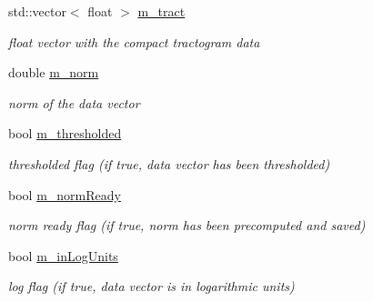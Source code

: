 \begin{DoxyCompactItemize}
\item 
\hypertarget{classcompactTract_adc11b75d4726c6bfc7891ef3dbaac133}{std\-::vector$<$ float $>$ \hyperlink{classcompactTract_adc11b75d4726c6bfc7891ef3dbaac133}{m\-\_\-tract}}\label{classcompactTract_adc11b75d4726c6bfc7891ef3dbaac133}

\begin{DoxyCompactList}\small\item\em float vector with the compact tractogram data \end{DoxyCompactList}\item 
\hypertarget{classcompactTract_a27eeff3e161d463509b144b3b19eff97}{double \hyperlink{classcompactTract_a27eeff3e161d463509b144b3b19eff97}{m\-\_\-norm}}\label{classcompactTract_a27eeff3e161d463509b144b3b19eff97}

\begin{DoxyCompactList}\small\item\em norm of the data vector \end{DoxyCompactList}\item 
\hypertarget{classcompactTract_a73f593f5373a547977675bdb1c5e1c41}{bool \hyperlink{classcompactTract_a73f593f5373a547977675bdb1c5e1c41}{m\-\_\-thresholded}}\label{classcompactTract_a73f593f5373a547977675bdb1c5e1c41}

\begin{DoxyCompactList}\small\item\em thresholded flag (if true, data vector has been thresholded) \end{DoxyCompactList}\item 
\hypertarget{classcompactTract_a85019388d6768104dd27f18ef285326c}{bool \hyperlink{classcompactTract_a85019388d6768104dd27f18ef285326c}{m\-\_\-norm\-Ready}}\label{classcompactTract_a85019388d6768104dd27f18ef285326c}

\begin{DoxyCompactList}\small\item\em norm ready flag (if true, norm has been precomputed and saved) \end{DoxyCompactList}\item 
\hypertarget{classcompactTract_a089b38c6a33223c24247dd839cf37568}{bool \hyperlink{classcompactTract_a089b38c6a33223c24247dd839cf37568}{m\-\_\-in\-Log\-Units}}\label{classcompactTract_a089b38c6a33223c24247dd839cf37568}

\begin{DoxyCompactList}\small\item\em log flag (if true, data vector is in logarithmic units) \end{DoxyCompactList}\end{DoxyCompactItemize}
